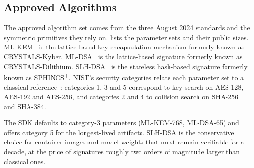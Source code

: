 \subsection{Approved Algorithms}\label{sec:pqc:algorithms}

The approved algorithm set comes from the three August 2024 standards and the symmetric primitives they rely on.  lists the parameter sets and their public sizes. ML-KEM~\cite{nist2024fips203} is the lattice-based key-encapsulation mechanism formerly known as CRYSTALS-Kyber. ML-DSA~\cite{nist2024fips204} is the lattice-based signature formerly known as CRYSTALS-Dilithium. SLH-DSA~\cite{nist2024fips205} is the stateless hash-based signature formerly known as SPHINCS\textsuperscript{+}. NIST's security categories relate each parameter set to a classical reference~\cite{nist2022ir8413}: categories 1, 3 and 5 correspond to key search on AES-128, AES-192 and AES-256, and categories 2 and 4 to collision search on SHA-256 and SHA-384.

The SDK defaults to category-3 parameters (ML-KEM-768, ML-DSA-65) and offers category 5 for the longest-lived artifacts. SLH-DSA is the conservative choice for container images and model weights that must remain verifiable for a decade, at the price of signatures roughly two orders of magnitude larger than classical ones.

